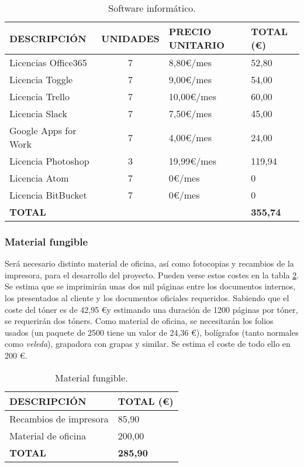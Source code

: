 \begin{table}[H]
\begin{center}
\begin{tabular}{l c l l}
\textbf{DESCRIPCIÓN} & \textbf{UNIDADES} & \textbf{PRECIO UNITARIO} & \textbf{TOTAL (\euro)}\\ \hline \hline
Licencias Office365 & 7 & 8,80\euro/mes & 52,80\\
Licencia Toggle & 7 & 9,00\euro/mes & 54,00\\
Licencia Trello & 7 & 10,00\euro/mes & 60,00\\
Licencia Slack & 7 & 7,50\euro/mes & 45,00\\
Google Apps for Work & 7 & 4,00\euro/mes & 24,00\\
Licencia Photoshop & 3 & 19,99\euro/mes & 119,94\\
Licencia Atom & 7 & 0\euro/mes & 0\\
Licencia BitBucket & 7 & 0\euro/mes & 0\\ \hline \hline
\textbf{TOTAL} & & & \textbf{355,74}\\ \hline
\end{tabular}
\caption{Software informático.}
\label{tab:software}
\end{center}
\end{table}



\subsubsection{Material fungible}
\par Será necesario distinto material de oficina, así como fotocopias y recambios de la impresora, para el desarrollo del proyecto. Pueden verse estos costes en la tabla \ref{tab:fungible}. Se estima que se imprimirán unas dos mil páginas entre los documentos internos, los presentados al cliente y los documentos oficiales requeridos. Sabiendo que el coste del tóner es de 42,95 \euro y estimando una duración de 1200 páginas por tóner, se requerirán dos tóners.
Como material de oficina, se necesitarán los folios usados (un paquete de 2500 tiene un valor de 24,36 \euro), bolígrafos (tanto normales como \textit{veleda}), grapadora con grapas y similar. Se estima el coste de todo ello en 200 \euro.


\begin{table}[H]
\begin{center}
\begin{tabular}{l l}
\textbf{DESCRIPCIÓN} & \textbf{TOTAL (\euro)}\\ \hline \hline
Recambios de impresora & 85,90\\
Material de oficina & 200,00\\ \hline \hline
\textbf{TOTAL} & \textbf{285,90}\\ \hline
\end{tabular}
\caption{Material fungible.}
\label{tab:fungible}
\end{center}
\end{table}


